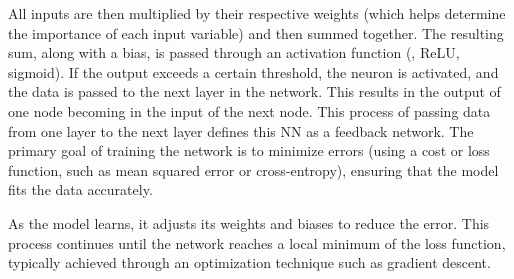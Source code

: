 All inputs are then multiplied by their respective weights (which helps determine the importance of each input variable) and then summed together.
The resulting sum, along with a bias, is passed through an activation function (\eg{}, ReLU, sigmoid).
If the output exceeds a certain threshold, the neuron is activated, and the data is passed to the next layer in the network.
This results in the output of one node becoming in the input of the next node.
This process of passing data from one layer to the next layer defines this NN as a feedback network.
The primary goal of training the network is to minimize errors (using a cost or loss function, such as mean squared error or cross-entropy), ensuring that the model fits the data accurately.

As the model learns, it adjusts its weights and biases to reduce the error. This process continues until the network reaches a local minimum of the loss function, typically achieved through an optimization technique such as gradient descent.
